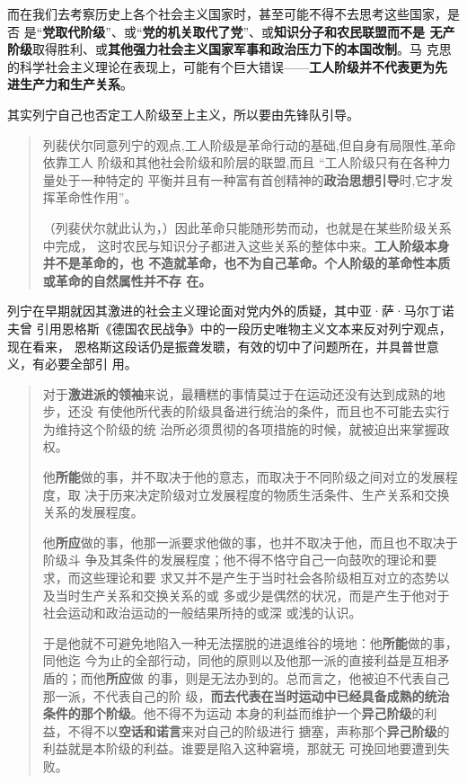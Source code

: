 而在我们去考察历史上各个社会主义国家时，甚至可能不得不去思考这些国家，是否
是“\textbf{党取代阶级}”、或“\textbf{党的机关取代了党}”、或\textbf{知识分子和农民联盟而不是
  无产阶级}取得胜利、或\textbf{其他强力社会主义国家军事和政治压力下的本国改制}。马
克思的科学社会主义理论在表现上，可能有个巨大错误——\textbf{工人阶级并不代表更为先
  进生产力和生产关系}。

其实列宁自己也否定工人阶级至上主义，所以要由先锋队引导。
\begin{quotation}
  列裴伏尔同意列宁的观点,工人阶级是革命行动的基础,但自身有局限性,革命依靠工人
  阶级和其他社会阶级和阶层的联盟,而且 “工人阶级只有在各种力量处于一种特定的
  平衡并且有一种富有首创精神的\textbf{政治思想引导}时,它才发挥革命性作用”。\cite{zhangxiaoyi}

  （列裴伏尔就此认为，）因此革命只能随形势而动，也就是在某些阶级关系中完成，
  这时农民与知识分子都进入这些关系的整体中来。\textbf{工人阶级本身并不是革命的，也
    不造就革命，也不为自己革命。个人阶级的革命性本质或革命的自然属性并不存
    在。}\cite[127]{xingcun}
\end{quotation}

列宁在早期就因其激进的社会主义理论面对党内外的质疑，其中亚·萨·马尔丁诺夫曾
引用恩格斯《德国农民战争》中的一段历史唯物主义文本来反对列宁观点，现在看来，
恩格斯这段话仍是振聋发聩，有效的切中了问题所在，并具普世意义，有必要全部引
用。

\begin{quotation}
  对于\textbf{激进派的领袖}来说，最糟糕的事情莫过于在运动还没有达到成熟的地步，还没
  有使他所代表的阶级具备进行统治的条件，而且也不可能去实行为维持这个阶级的统
  治所必须贯彻的各项措施的时候，就被迫出来掌握政权。

  他\textbf{所能}做的事，并不取决于他的意志，而取决于不同阶级之间对立的发展程度，取
  决于历来决定阶级对立发展程度的物质生活条件、生产关系和交换关系的发展程度。

  他\textbf{所应}做的事，他那一派要求他做的事，也并不取决于他，而且也不取决于阶级斗
  争及其条件的发展程度；他不得不恪守自己一向鼓吹的理论和要求，而这些理论和要
  求又并不是产生于当时社会各阶级相互对立的态势以及当时生产关系和交换关系的或
  多或少是偶然的状况，而是产生于他对于社会运动和政治运动的一般结果所持的或深
  或浅的认识。

  于是他就不可避免地陷入一种无法摆脱的进退维谷的境地：他\textbf{所能}做的事，同他迄
  今为止的全部行动，同他的原则以及他那一派的直接利益是互相矛盾的；而他\textbf{所应}做
  的事，则是无法办到的。总而言之，他被迫不代表自己那一派，不代表自己的阶
  级，\textbf{而去代表在当时运动中已经具备成熟的统治条件的那个阶级}。他不得不为运动
  本身的利益而维护一个\textbf{异己阶级}的利益，不得不以\textbf{空话和诺言}来对自己的阶级进行
  搪塞，声称那个\textbf{异己阶级}的利益就是本阶级的利益。谁要是陷入这种窘境，那就无
  可挽回地要遭到失败。\cite[303-304]{maenwen3}
\end{quotation}

